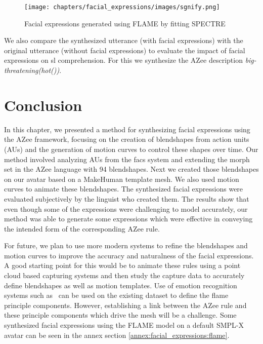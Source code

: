 \documentclass[../../main]{subfiles}
\begin{document}
\begin{figure}[h]
    \centering
    \texttt{[image: chapters/facial\_expressions/images/sgnify.png]}
    \caption{Facial expressions generated using FLAME by fitting SPECTRE}
    \label{ch:facial_expressions:fig:spectre}
\end{figure}

We also compare the synthesized utterance (with facial expressions) with the original utterance (without facial expressions) to evaluate the impact of facial expressions on \gls{sl} comprehension. For this we synthesize the AZee description \emph{big-threatening(hot())}.

\section{Conclusion}
\label{ch:facial_expressions:conclusion}

In this chapter, we presented a method for synthesizing facial expressions using the AZee framework, focusing on the creation of blendshapes from action units (AUs) and the generation of motion curves to control these shapes over time. Our method involved analyzing AUs from the \gls{facs} system and extending the morph set in the AZee language with 94 blendshapes. Next we created those blendshapes on our avatar based on a MakeHuman template mesh. We also used motion curves to animate these blendshapes. The synthesized facial expressions were evaluated subjectively by the linguist who created them. The results show that even though some of the expressions were challenging to model accurately, our method was able to generate some expressions which were effective in conveying the intended form of the corresponding AZee rule.

For future, we plan to use more modern systems to refine the blendshapes and motion curves to improve the accuracy and naturalness of the facial expressions. A good starting point for this would be to animate these rules using a point cloud based capturing systems and then study the capture data to accurately define blendshapes as well as motion templates. Use of emotion recognition systems such as~\cite{EMOCA} can be used on the existing dataset to define the flame~\cite{FLAME} principle components. However, establishing a link between the AZee rule and these principle components which drive the mesh will be a challenge. Some synthesized facial expressions using the FLAME model on a default SMPL-X avatar can be seen in the annex section \ref{annex:facial_expressions:flame}.
\end{document}

